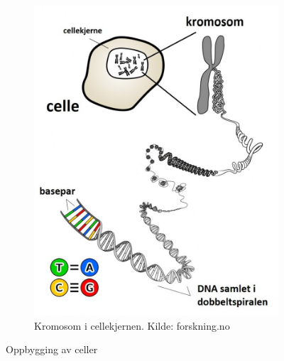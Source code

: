 \documentclass[main.tex]{subfiles}
\begin{document}
\begin{figure}[h!]
    \begin{subfigure}{.5\textwidth}
    \centering
    \includegraphics[scale = 0.20]{../figures/dna.jpg}
    \caption{Kromosom i cellekjernen. Kilde: forskning.no}
    \end{subfigure}
    \caption{Oppbygging av celler}
    \label{fig:celler}
\end{figure}
\end{document}
